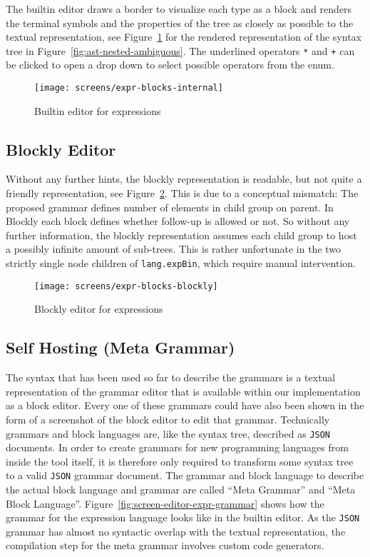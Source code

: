 \documentclass[sigconf,natbib=false]{acmart}
\newcommand{\enquote}[1]{``#1''}
\begin{document}
The builtin editor draws a border to visualize each type as a block and renders the terminal symbols and the properties of the tree as closely as possible to the textual representation, see Figure~\ref{fig:screen-editor-expr-internal} for the rendered representation of the syntax tree in Figure~\ref{fig:ast-nested-ambiguous}. The underlined operators \texttt{*} and \texttt{+} can be clicked to open a drop down to select possible operators from the enum.

\begin{figure}[H]
  \texttt{[image: screens/expr-blocks-internal]}
  \caption{Builtin editor for expressions}
  \label{fig:screen-editor-expr-internal}
\end{figure}

\subsection{Blockly Editor}

Without any further hints, the blockly representation is readable, but not quite a friendly representation, see Figure~\ref{fig:screen-editor-expr-blockly}. This is due to a conceptual mismatch: The proposed grammar defines number of elements in child group on parent. In Blockly each block defines whether follow-up is allowed or not. So without any further information, the blockly representation assumes each child group to host a possibly infinite amount of sub-trees. This is rather unfortunate in the two strictly single node children of \texttt{lang.expBin}, which require manual intervention.

\begin{figure}[H]
  \texttt{[image: screens/expr-blocks-blockly]}
  \caption{Blockly editor for expressions}
  \label{fig:screen-editor-expr-blockly}
\end{figure}

\subsection{Self Hosting (Meta Grammar)}

The syntax that has been used so far to describe the grammars is a textual representation of the grammar editor that is available within our implementation as a block editor. Every one of these grammars could have also been shown in the form of a screenshot of the block editor to edit that grammar. Technically grammars and block languages are, like the syntax tree, described as \texttt{JSON} documents. In order to create grammars for new programming languages from inside the tool itself, it is therefore only required to transform some syntax tree to a valid \texttt{JSON} grammar document. The grammar and block language to describe the actual block language and grammar are called \enquote{Meta Grammar} and \enquote{Meta Block Language}. Figure~\ref{fig:screen-editor-expr-grammar} shows how the grammar for the expression language looks like in the builtin editor. As the \texttt{JSON} grammar has almost no syntactic overlap with the textual representation, the compilation step for the meta grammar involves custom code generators.
\end{document}
